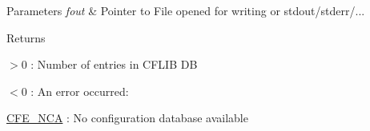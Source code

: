 \begin{DoxyParams}{Parameters}
{\em fout} & Pointer to File opened for writing or {\ttfamily stdout/{\ttfamily stderr/}.}..\\
\hline
\end{DoxyParams}
\begin{DoxyReturn}{Returns}
\begin{DoxyItemize}
\item {\ttfamily $>$0} \-: Number of entries in C\-F\-L\-I\-B D\-B \item {\ttfamily $<$0} \-: An error occurred\-:
\begin{DoxyItemize}
\item \hyperlink{group__errors_gaf8cd36471ddcc549668f49238855609d}{C\-F\-E\-\_\-\-N\-C\-A} \-: No configuration database available 
\end{DoxyItemize}\end{DoxyItemize}

\end{DoxyReturn}
